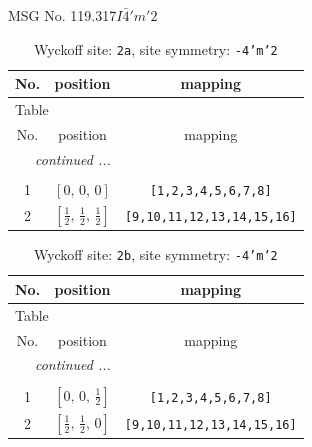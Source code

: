 \documentclass[fleqn,8pt]{jsarticle}
\begin{document}
\setcounter{MaxMatrixCols}{32}

\renewcommand{\tablename}{Table~}
\renewcommand{\figurename}{Figure~}
\begin{center}
\LARGE
MSG No. 119.317\quad$I\bar{4}'m'2$
\end{center}
\renewcommand{\arraystretch}{1.2}
\begin{longtable}{ccc}
\caption{Wyckoff site: {\tt 2a}, site symmetry: {\tt -4'm'2}}
 \\
 \hline \hline
No. & position & mapping \\ \hline \endfirsthead

\multicolumn{2}{l}{\tablename\ \thetable{}} \\
 \hline \hline
No. & position & mapping \\ \hline \endhead

 \hline \hline
\multicolumn{2}{r}{\footnotesize\it continued ...} \\ \endfoot

 \hline \hline
\multicolumn{2}{r}{} \\ \endlastfoot

1 & $\left[ 0,\, 0,\, 0 \right]$ & {\tt [1,2,3,4,5,6,7,8]} \\ \hline
2 & $\left[ \frac{1}{2},\, \frac{1}{2},\, \frac{1}{2} \right]$ & {\tt [9,10,11,12,13,14,15,16]} \\
\end{longtable}
\renewcommand{\arraystretch}{1.2}
\begin{longtable}{ccc}
\caption{Wyckoff site: {\tt 2b}, site symmetry: {\tt -4'm'2}}
 \\
 \hline \hline
No. & position & mapping \\ \hline \endfirsthead

\multicolumn{2}{l}{\tablename\ \thetable{}} \\
 \hline \hline
No. & position & mapping \\ \hline \endhead

 \hline \hline
\multicolumn{2}{r}{\footnotesize\it continued ...} \\ \endfoot

 \hline \hline
\multicolumn{2}{r}{} \\ \endlastfoot

1 & $\left[ 0,\, 0,\, \frac{1}{2} \right]$ & {\tt [1,2,3,4,5,6,7,8]} \\ \hline
2 & $\left[ \frac{1}{2},\, \frac{1}{2},\, 0 \right]$ & {\tt [9,10,11,12,13,14,15,16]} \\
\end{longtable}
\end{document}
